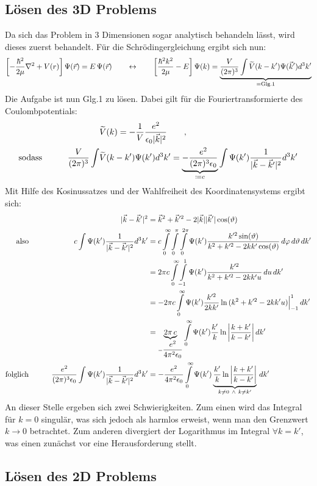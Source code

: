 \subsection{Lösen des 3D Problems}
Da sich das Problem in 3 Dimensionen sogar analytisch behandeln lässt, wird dieses zuerst behandelt. Für die Schrödingergleichung ergibt sich nun: 
\begin{align*}
\left [-\frac{\hbar^2}{2\mu}\nabla ^2 + V(r)\right ]\Psi(\vec{r}) &= E\, \Psi(\vec{r}) \qquad \leftrightarrow \qquad\left [\frac{\hbar^2k^2}{2\mu}-E  \right ]\Psi(k) =\underbrace{ \frac{V}{(2\pi)^3} \int  \widetilde{V}(k-k')\Psi(\vec{k} ') d^3 k'}_{= \text{Glg.1}} \\
\end{align*}
Die Aufgabe ist nun Glg.1 zu lösen. Dabei gilt für die Fouriertransformierte des Coulombpotentials: 
\begin{alignat*}{2}
									&& &\widetilde V(k) = -\frac{1}{V}\frac{e^2}{\epsilon_0 |\vec{k} |^2} \qquad , \\
\text{sodass}\qquad 	&& \frac{V}{(2\pi)^3} \int  &\widetilde{V}(k-k')\Psi(k ') d^3 k' = \underbrace{-\frac{e^2}{(2\pi)^3 \epsilon_0}}_{\coloneqq c} \int  \Psi(k ')\frac{1}{|\vec{k} - \vec{k} '|^2} d^3 k'
\end{alignat*}
Mit Hilfe des Kosinussatzes und der Wahlfreiheit des Koordinatensystems ergibt sich: 
\begin{alignat*}{2}
&& |\vec{k} - \vec{k} ' |^2 &= \vec{k} ^2 + \vec{k} '^2 -2|\vec{k} ||\vec{k} '|\cos(\vartheta) 	 \\
\text{also}\qquad && c \int  \Psi(k ')\frac{1}{|\vec{k} - \vec{k} '|^2} d^3 k' 	&= c\int\limits_{0}^{\infty}\int\limits_{0}^{\pi}\int\limits_{0}^{2\pi} \Psi(k ')\frac{k '^2 \sin(\vartheta)}{k ^2 + k '^2 -2kk '\cos(\vartheta)} \,d\varphi \, d\vartheta \, dk' \\
&& &= 2\pi c\int\limits_{0}^{\infty}\int\limits_{-1}^{1} \Psi(k ')\frac{k '^2}{k ^2 + k '^2 -2kk 'u} \,du \, dk' \\
&& &= -2\pi c\int\limits_{0}^{\infty} \Psi(k ')\frac{k '^2}{2kk '}\ln{(k ^2 + k '^2 -2kk 'u)}\Big |_{-1}^1 \,dk' \\
&& &= \underbrace{2\pi \,c}_{-\dfrac{e^2}{4\pi^2 \epsilon_0}} \int\limits_{0}^{\infty} \Psi(k ')\frac{k '}{k}\ln{\left |\frac{k + k '}{k-k'}\right |} \, dk' \\
\text{folglich}\qquad &&  \frac{e^2}{(2\pi)^3 \epsilon_0} \int  \Psi(k ')\frac{1}{|\vec{k} - \vec{k} '|^2} d^3 k' &= -\dfrac{e^2}{4\pi^2 \epsilon_0} \int\limits_{0}^{\infty} \Psi(k ')\underbrace{\frac{k '}{k}\ln{\left |\frac{k + k '}{k-k'}\right |}}_{k\neq0\  \wedge \  k\neq k'} \, dk' 
\end{alignat*}
An dieser Stelle ergeben sich zwei Schwierigkeiten. Zum einen wird das Integral für $k = 0$ singulär, was sich jedoch als harmlos erweist, wenn man den Grenzwert $k \rightarrow 0$ betrachtet. Zum anderen divergiert der Logarithmus im Integral $\forall k=k'$, was einen zunächst vor eine Herausforderung stellt. 
\subsection{Lösen des 2D Problems}
